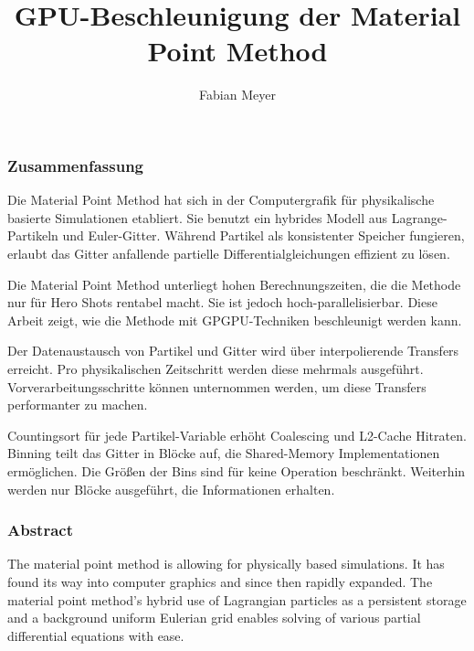 \documentclass[m,times]{cgMA}
\begin{document}
\author{Fabian Meyer}
\title{GPU-Beschleunigung der Material Point Method}

\maketitle

\clearpage
{}

\vfill
\begin{center}
\subsubsection*{Zusammenfassung}
\end{center}
Die Material Point Method hat sich in der Computergrafik für physikalische basier\-te Simulationen etabliert. Sie benutzt ein hybrides Modell aus Lagrange-Partikeln und Euler-Gitter. Während Partikel als konsistenter Speicher fungieren, erlaubt das Gitter anfallende partielle Differentialgleichungen effizient zu lösen.

\noindent Die Material Point Method unterliegt hohen Berechnungszeiten, die die Methode nur für Hero Shots rentabel macht. Sie ist jedoch hoch-parallelisierbar. Diese Arbeit zeigt, wie die Methode mit GPGPU-Techniken beschleunigt werden kann.

\noindent Der Datenaustausch von Partikel und Gitter wird über interpolierende Transfers erreicht. Pro physikalischen Zeitschritt werden diese mehrmals ausgeführt. Vorverarbeitungsschritte können unternommen werden, um diese Transfers performanter zu machen.

\noindent Countingsort für jede Partikel-Variable erhöht Coalescing und L2-Cache Hitraten. Binning teilt das Gitter in Blöcke auf, die Shared-Memory Implementationen er\-mög\-lich\-en. Die Größen der Bins sind für keine Operation beschränkt. Weiterhin werden nur Blöcke ausgeführt, die Informationen erhalten.

\vfill
\begin{center}
\subsubsection*{Abstract}
\end{center}
The material point method is allowing for physically based simulations. It has found its way into computer graphics and since then rapidly expanded. The material point method's hybrid use of Lagrangian particles as a persistent storage and a background uniform Eulerian grid enables solving of various partial differential equations with ease.
\end{document}
